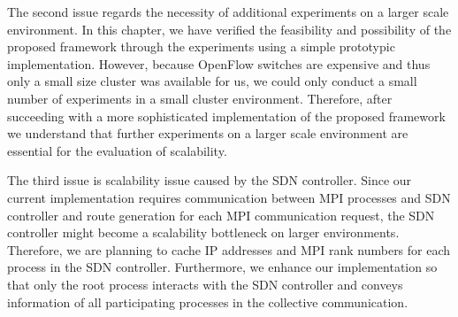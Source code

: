 The second issue regards the necessity of additional experiments on a
larger scale environment. In this chapter, we have verified the
feasibility and possibility of the proposed framework
through the experiments using a simple prototypic implementation.
However, because OpenFlow switches are expensive and thus only a small
size cluster was available for us, we could only conduct
a small number of experiments in a small cluster environment. Therefore,
after succeeding with a more sophisticated implementation of the
proposed framework we understand that further experiments
on a larger scale environment are essential for the evaluation of
scalability.

The third issue is scalability issue caused by the SDN controller.
Since our current implementation requires communication between MPI
processes and SDN controller and route generation for each MPI
communication request, the SDN controller might become a scalability
bottleneck on larger environments. Therefore, we are planning to cache IP
addresses and MPI rank numbers for each process in the SDN controller.
Furthermore, we enhance our implementation so that only the root process
interacts with the SDN controller and conveys information of all participating
processes in the collective communication.
